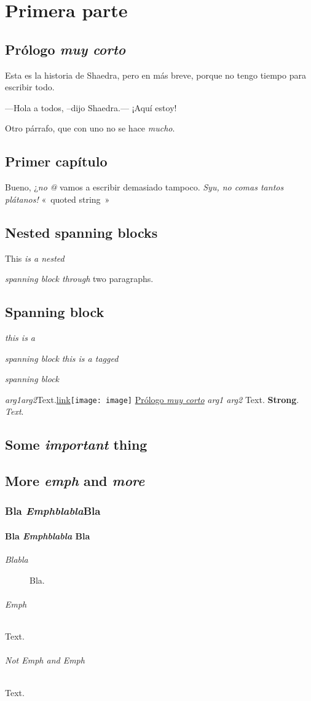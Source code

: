 \part{Primera parte}
\label{s:1}
\chapter{Prólogo \emph{muy corto}}
\label{s:2}
Esta es la historia de Shaedra, pero en más breve, porque no tengo tiempo para
escribir todo.

---Hola a todos, –dijo Shaedra.— ¡Aquí estoy!

Otro párrafo, que con uno no se hace
\textit{mucho}.

\chapter{Primer capítulo}
\label{s:3}
Bueno, ¿\emph{no}
\emph{@}
vamos a escribir demasiado tampoco.
\textit{Syu, no comas tantos plátanos!}
«~quoted string~»

\chapter{Nested spanning blocks}
\label{s:4}
This
\emph{is a
\emph{nested}}

\emph{\emph{spanning}
block through}
two paragraphs.

\chapter{Spanning block}
\label{s:5}
\emph{this is a}

\emph{spanning block}
\textit{this is a tagged}

\textit{spanning block}

\emph{arg1arg2}Text.\url{link}\texttt{[image: image]}
\hyperref[s:2]{Prólogo \emph{muy corto}}
\emph{arg1 arg2}
Text.
\textbf{Strong}.
\emph{\emph{Text}}.

\chapter{Some \emph{important} thing}
\label{s:6}
\chapter{More \emph{emph} and \emph{more}}
\label{s:7}
\section{Bla \textit{Emphblabla}Bla}
\label{s:8}
\subsection{Bla \textit{Emphblabla} Bla}
\label{s:9}
\begin{description}
\item[\emph{Blabla}]
Bla.
\end{description}

\paragraph{\emph{Emph}}
Text.

\paragraph{Not Emph and \emph{Emph}}
Text.

